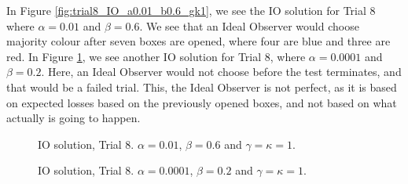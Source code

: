 In Figure \ref{fig:trial8_IO_a0.01_b0.6_gk1}, we see the IO solution for Trial 8 where $\alpha=0.01$ and $\beta=0.6$. We see that an Ideal Observer would choose majority colour after seven boxes are opened, where four are blue and three are red. In Figure \ref{fig:trial8_IO_a0.0001_b0.2_gk1}, we see another IO solution for Trial 8, where $\alpha=0.0001$ and $\beta=0.2$. Here, an Ideal Observer would not choose before the test terminates, and that would be a failed trial. This, the Ideal Observer is not perfect, as it is based on expected losses based on the previously opened boxes, and not based on what actually is going to happen.

\begin{figure}
    \centering
     \begin{minipage}[t]{0.45\textwidth}
        \centering
        \scalebox{0.7}{}
        \caption[IO solution, Trial 8. $\alpha=0.01$, $\beta=0.6$ and $\gamma=\kappa=1$.]{IO solution, Trial 8. $\alpha=0.01$, $\beta=0.6$ and $\gamma=\kappa=1$.}
        \label{fig:trial8_IO_a0.01_b0.6_gk1}
     \end{minipage}\hfill
     \begin{minipage}[t]{0.45\textwidth}
        \centering
        \scalebox{0.7}{}
        \caption[IO solution, Trial 8. $\alpha=0.0001$, $\beta=0.2$ and $\gamma=\kappa=1$.]{IO solution, Trial 8. $\alpha=0.0001$, $\beta=0.2$ and $\gamma=\kappa=1$.}
        \label{fig:trial8_IO_a0.0001_b0.2_gk1}
     \end{minipage}
\end{figure}




